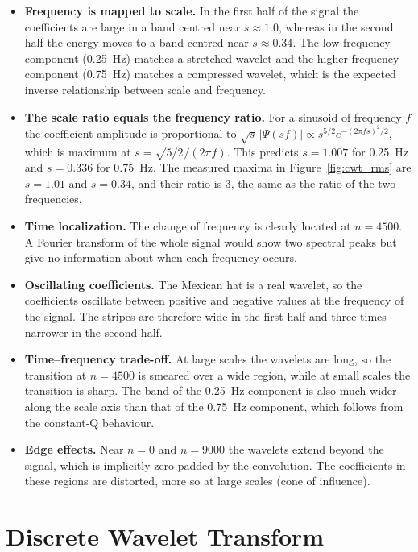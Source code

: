 \documentclass[11pt,a4paper]{article}
\begin{document}
\begin{itemize}[leftmargin=*]
    \item \textbf{Frequency is mapped to scale.} In the first half of the signal the coefficients are large in a band centred near $s \approx 1.0$, whereas in the second half the energy moves to a band centred near $s \approx 0.34$. The low-frequency component (0.25~Hz) matches a stretched wavelet and the higher-frequency component (0.75~Hz) matches a compressed wavelet, which is the expected inverse relationship between scale and frequency.
    \item \textbf{The scale ratio equals the frequency ratio.} For a sinusoid of frequency $f$ the coefficient amplitude is proportional to $\sqrt{s}\,|\Psi(sf)| \propto s^{5/2} e^{-(2\pi f s)^2/2}$, which is maximum at $s = \sqrt{5/2}/(2\pi f)$. This predicts $s = 1.007$ for 0.25~Hz and $s = 0.336$ for 0.75~Hz. The measured maxima in Figure~\ref{fig:cwt_rms} are $s = 1.01$ and $s = 0.34$, and their ratio is 3, the same as the ratio of the two frequencies.
    \item \textbf{Time localization.} The change of frequency is clearly located at $n = 4500$. A Fourier transform of the whole signal would show two spectral peaks but give no information about when each frequency occurs.
    \item \textbf{Oscillating coefficients.} The Mexican hat is a real wavelet, so the coefficients oscillate between positive and negative values at the frequency of the signal. The stripes are therefore wide in the first half and three times narrower in the second half.
    \item \textbf{Time--frequency trade-off.} At large scales the wavelets are long, so the transition at $n = 4500$ is smeared over a wide region, while at small scales the transition is sharp. The band of the 0.25~Hz component is also much wider along the scale axis than that of the 0.75~Hz component, which follows from the constant-Q behaviour.
    \item \textbf{Edge effects.} Near $n = 0$ and $n = 9000$ the wavelets extend beyond the signal, which is implicitly zero-padded by the convolution. The coefficients in these regions are distorted, more so at large scales (cone of influence).
\end{itemize}

\section{Discrete Wavelet Transform}
\end{document}
